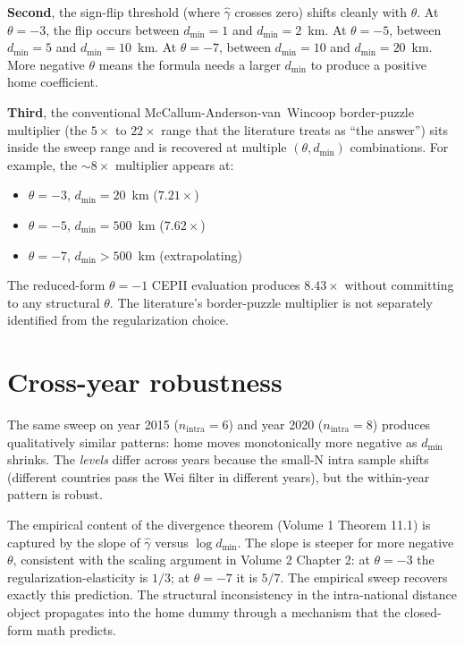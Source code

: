 \documentclass[11pt,letterpaper,oneside]{book}
\theoremstyle{definition}
\theoremstyle{remark}
\begin{document}
\textbf{Second}, the sign-flip threshold (where $\hat{\gamma}$ crosses
zero) shifts cleanly with $\theta$. At $\theta = -3$, the flip occurs
between $d_{\min} = 1$ and $d_{\min} = 2$~km. At $\theta = -5$, between
$d_{\min} = 5$ and $d_{\min} = 10$~km. At $\theta = -7$, between
$d_{\min} = 10$ and $d_{\min} = 20$~km. More negative $\theta$ means
the formula needs a larger $d_{\min}$ to produce a positive home
coefficient.

\textbf{Third}, the conventional McCallum-Anderson-van~Wincoop border-puzzle
multiplier (the $5\times$ to $22\times$ range that the literature
treats as ``the answer'') sits inside the sweep range and is recovered
at multiple $(\theta, d_{\min})$ combinations. For example, the
$\sim 8\times$ multiplier appears at:
\begin{itemize}
  \item $\theta = -3$, $d_{\min} = 20$~km ($7.21\times$)
  \item $\theta = -5$, $d_{\min} = 500$~km ($7.62\times$)
  \item $\theta = -7$, $d_{\min} > 500$~km (extrapolating)
\end{itemize}
The reduced-form $\theta = -1$ CEPII evaluation produces $8.43\times$
without committing to any structural $\theta$. The literature's
border-puzzle multiplier is not separately identified from the
regularization choice.

\section{Cross-year robustness}

The same sweep on year 2015 ($n_{\text{intra}} = 6$) and year 2020
($n_{\text{intra}} = 8$) produces qualitatively similar patterns:
home moves monotonically more negative as $d_{\min}$ shrinks. The
\emph{levels} differ across years because the small-N intra sample
shifts (different countries pass the Wei filter in different years),
but the within-year pattern is robust.

\begin{insight}
The empirical content of the divergence theorem (Volume 1 Theorem 11.1)
is captured by the slope of $\hat{\gamma}$ versus $\log d_{\min}$. The
slope is steeper for more negative $\theta$, consistent with the
scaling argument in Volume 2 Chapter 2: at $\theta = -3$ the
regularization-elasticity is $1/3$; at $\theta = -7$ it is $5/7$.
The empirical sweep recovers exactly this prediction. The structural
inconsistency in the intra-national distance object propagates into
the home dummy through a mechanism that the closed-form math
predicts.
\end{insight}
\end{document}
